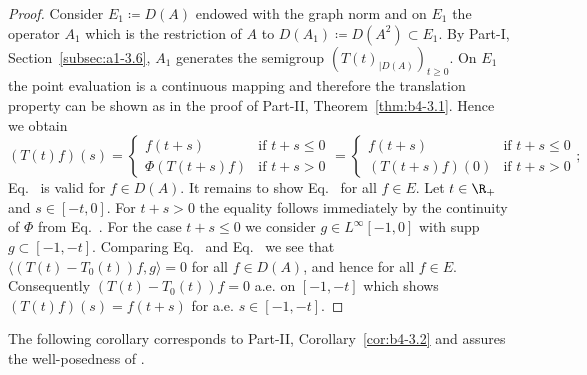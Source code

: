\begin{proof}
Consider $E_1 \coloneqq D(A)$ endowed with the graph norm 
and on $E_1$ the operator $A_1$ which is the restriction of\/ $A$ to $D(A_1) \coloneqq D(A^{2})\subset E_1$.
By 
Part-I, Section~\ref{subsec:a1-3.6}, $A_1$ generates the semigroup $(T(t)_{|D(A)})_{t \geq 0}$.
On $E_1$ the point evaluation is a continuous mapping and therefore the translation property can be shown as in the proof of Part-II, Theorem~\ref{thm:b4-3.1}.
Hence we obtain
\begin{equation}\label{eq:c4-3.4}
(T(t)f)(s)= \begin{cases}
    f(t+s) &\text{if } t+s \leq 0 \\
    \Phi(T(t+s)f) &\text{if } t+s > 0
\end{cases} = \begin{cases}
    f(t+s) &\text{if } t+s \leq 0 \\
    (T(t+s)f)(0) &\text{if } t+s > 0
\end{cases};
\end{equation}
\ie Eq.~ is valid for $f \in D(A)$.
It remains to show Eq.~ for all $f \in E$.
Let $t \in \R_+$ and $s \in [-t,0]$.
For $t + s > 0$ the equality follows immediately by the continuity of\/ $\Phi$ from Eq.~.
For the case $t + s \leq 0$ we consider $g \in L^{\infty}[-1,0]$ with supp $g \subset [-1,-t]$.
Comparing Eq.~ and Eq.~ we see that $\langle(T(t)-T_0(t))f,g\rangle = 0$ for all $f \in D(A)$, and hence for all $f \in E$.
Consequently $(T(t)-T_{0}(t))f = 0$ a.e. on $[-1,-t]$ which shows $(T(t)f)(s) = f(t+s)$ for a.e. $s \in [-1,-t]$.
\end{proof}
The following corollary corresponds to Part-II, Corollary~\ref{cor:b4-3.2} and assures the well-posed\-ness of .

